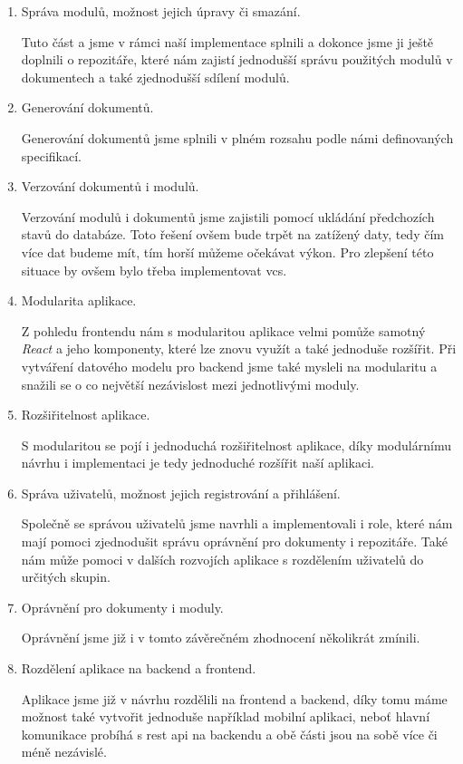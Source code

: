 \begin{enumerate}
    \item Správa modulů, možnost jejich úpravy či smazání.

          Tuto část a jsme v rámci naší implementace splnili a dokonce jsme ji ještě doplnili o repozitáře,
          které nám zajistí jednodušší správu použitých modulů v dokumentech a také zjednodušší sdílení
          modulů.
    \item Generování dokumentů.

          Generování dokumentů jsme splnili v plném rozsahu podle námi definovaných specifikací.
    \item Verzování dokumentů i modulů.

          Verzování modulů i dokumentů jsme zajistili pomocí ukládání předchozích stavů do databáze. Toto řešení
          ovšem bude trpět na zatížený daty, tedy čím více dat budeme mít, tím horší můžeme očekávat výkon. Pro zlepšení
          této situace by ovšem bylo třeba implementovat \gls{vcs}.
    \item Modularita aplikace.

         Z pohledu frontendu nám s modularitou aplikace velmi pomůže samotný \textit{React} a jeho komponenty, které lze znovu využít
         a také jednoduše rozšířit. Při vytváření datového modelu pro backend jsme také mysleli na modularitu a snažili se o co
         největší nezávislost mezi jednotlivými moduly.
    \item Rozšiřitelnost aplikace.

          S modularitou se pojí i jednoduchá rozšiřitelnost aplikace, díky modulárnímu návrhu i implementaci je tedy jednoduché
          rozšířit naší aplikaci.
    \item Správa uživatelů, možnost jejich registrování a přihlášení.

          Společně se správou uživatelů jsme navrhli a implementovali i role, které nám mají pomoci zjednodušit správu oprávnění
          pro dokumenty i repozitáře. Také nám může pomoci v dalších rozvojích aplikace s rozdělením uživatelů do určitých skupin.

    \item Oprávnění pro dokumenty i moduly.

          Oprávnění jsme již i v tomto závěrečném zhodnocení několikrát zmínili.
    \item Rozdělení aplikace na backend a frontend.

          Aplikace jsme již v návrhu rozdělili na frontend a backend, díky tomu máme možnost také vytvořit jednoduše například mobilní
          aplikaci, neboť hlavní komunikace probíhá s \gls{rest} \gls{api} na backendu a obě části jsou na sobě více či méně nezávislé.
\end{enumerate}